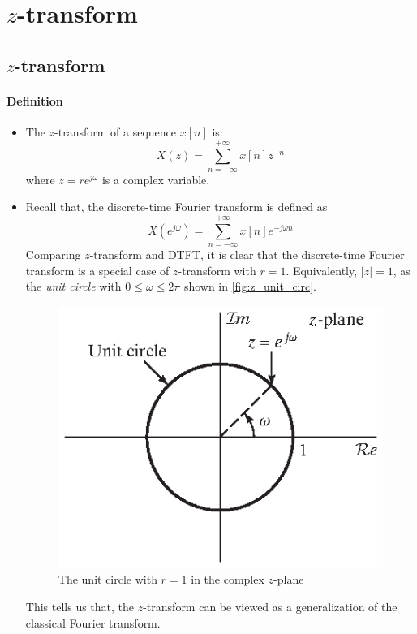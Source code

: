 \section{$z$-transform}
\subsection{$z$-transform}
\paragraph{Definition}
\begin{itemize}
    \item The $z$-transform of a sequence $x[n]$ is:
        \[
            X(z) = \sum_{n=-\infty}^{+\infty} x[n] z^{-n}
        \]
        where $z = re^{j\omega}$ is a complex variable.

    \item Recall that, the discrete-time Fourier transform is defined as
        \[
            X(e^{j\omega}) = \sum_{n=-\infty}^{+\infty} x[n] e^{-j\omega n}
        \]
    Comparing $z$-transform and DTFT, it is clear that the discrete-time Fourier transform is a special case of $z$-transform with $r=1$. Equivalently, $\lvert z \rvert = 1$, as the \textit{unit circle} with $0 \leq \omega \leq 2\pi $ shown in \autoref{fig:z_unit_circ}.
    \begin{figure}[H]
        \centering
        \includegraphics{images/z_plane.eps}
        \caption{The unit circle with $r=1$ in the complex $z$-plane}
        \label{fig:z_unit_circ}
    \end{figure}
    This tells us that, the $z$-transform can be viewed as a generalization of the classical Fourier transform.
\end{itemize}

